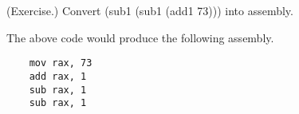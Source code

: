 \documentclass[letterpaper]{article}
\begin{document}
\begin{mdframed}
    (Exercise.) Convert \code(sub1 (sub1 (add1 73))) into assembly. 

    \begin{mdframed}
        The above code would produce the following assembly. 
        \begin{verbatim}
    mov rax, 73
    add rax, 1 
    sub rax, 1
    sub rax, 1\end{verbatim}
    \end{mdframed}
\end{mdframed}
\end{document}
